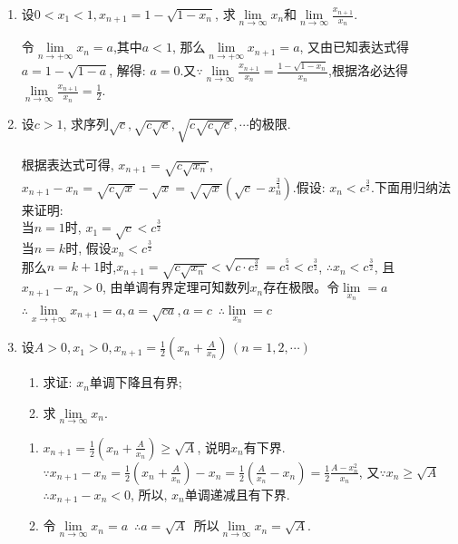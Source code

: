 \begin{enumerate}
\begin{solution}
	\end{solution}
	\item 设$0<x_1<1, x_{n+1}=1-\sqrt{1-x_n}$, 求$\lim\limits_{n \rightarrow \infty}x_n$和$\lim\limits_{n\rightarrow \infty}\frac{x_{n+1}}{x_n}$.
	\begin{solution}
		令$\lim\limits_{n\rightarrow +\infty}x_n=a$,其中$a<1$, 那么$\lim\limits_{n\rightarrow +\infty}x_{n+1}=a$, 又由已知表达式得$a=1-\sqrt{1-a}$, 解得: $a=0$.又$\because\lim\limits_{n\rightarrow \infty}\tfrac{x_{n+1}}{x_n}=\frac{1-\sqrt{1-x_n}}{x_n}$,根据洛必达得$\lim\limits_{n\rightarrow \infty}\frac{x_{n+1}}{x_n}=\frac{1}{2}$.
	\end{solution} 
	\item 设$c>1$, 求序列$\sqrt{c}, \sqrt{c\sqrt{c}},\sqrt{c\sqrt{c\sqrt{c}}},\cdots$的极限.
	\begin{solution}
		根据表达式可得, $x_{n+1}=\sqrt{c\sqrt{x_n}}$, $x_{n+1}-x_{n}=\sqrt{c\sqrt{x}}-\sqrt{x}=\sqrt{\sqrt{x}}(\sqrt{c}-x_n^{\frac{3}{4}})$.假设: $x_n<c^\frac{3}{2}$.下面用归纳法来证明:\\
		当$n=1$时, $x_1=\sqrt{c}<c^\frac{3}{2}$\\
		当$n=k$时, 假设$x_n<c^\frac{3}{2}$\\
		那么$n=k+1$时,$x_{n+1}=\sqrt{c\sqrt{x_n}}<\sqrt{c\cdot c^\frac{3}{2}}=c^\frac{5}{4}<c^\frac{3}{2}$, $\therefore x_n<c^{\frac{3}{2}}$, 且$x_{n+1}-x_{n}>0$, 由单调有界定理可知数列${x_n}$存在极限。令$\lim\limits_{x_n}=a$
		$\therefore \lim\limits_{x\rightarrow +\infty}x_{n+1}=a,a=\sqrt{ca},a=c$\ $\therefore \lim\limits_{x_n}=c$
	\end{solution}
	\item 设$A>0,x_1>0,x_{n+1}=\frac{1}{2}(x_n+\frac{A}{x_n})\,(n=1,2,\cdots)$
	\begin{enumerate}
		\item 求证: $x_n$单调下降且有界;
		\item 求$\lim\limits_{n\rightarrow \infty}x_n$.
	\end{enumerate}
	\begin{solution}
		\begin{enumerate}
			\item $x_{n+1}=\frac{1}{2}(x_n+\frac{A}{x_n})\ge \sqrt{A}$, 说明$x_n$有下界.\\
			$\because x_{n+1}-x_n=\frac{1}{2}(x_n+\frac{A}{x_n})-x_n=\frac{1}{2}(\frac{A}{x_n}-x_n)=\frac{1}{2}\frac{A-x_n^2}{x_n}$, 又$\because x_n \ge \sqrt{A}$\ $\therefore x_{n+1}-x_n<0$, 所以, $x_n$单调递减且有下界.
			\item 令$\lim\limits_{n \rightarrow \infty}x_n=a$\ $\therefore a=\sqrt{A}$\ 所以$\lim\limits_{n \rightarrow \infty}x_n=\sqrt{A}$.
		\end{enumerate}
		

\end{solution}
\end{enumerate}
